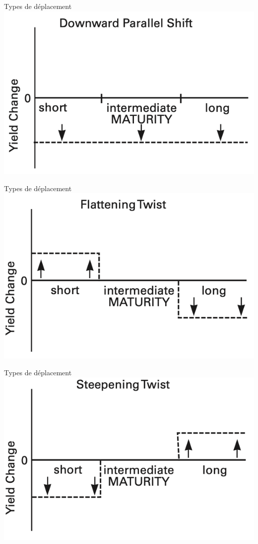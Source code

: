 \documentclass{beamer}
\begin{document}
\begin{frame}{Types de déplacement}
\includegraphics{2}
\end{frame}

\begin{frame}{Types de déplacement}
\includegraphics{3}
\end{frame}

\begin{frame}{Types de déplacement}
\includegraphics{4}
\end{frame}
\end{document}
